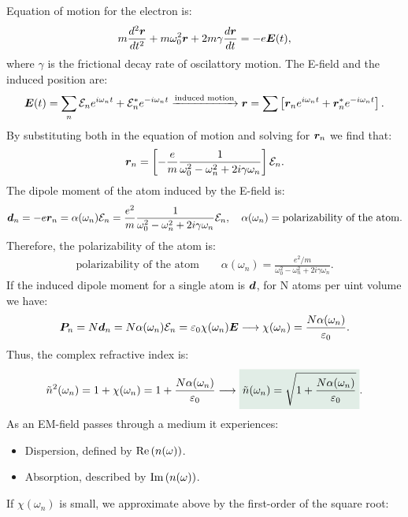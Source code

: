 Equation of motion for the electron is:
\begin{align}
    m\frac{d^2\bm{r}}{dt^2}+m\omega_0^2\bm{r}+2m\gamma\frac{d\bm{r}}{dt}=-e\bm{E}(t),
\end{align}
where $\gamma$ is the frictional decay rate of oscilattory motion. The E-field and the induced position are:
\begin{align}
    \bm{E}(t)=\sum_n\mathcal{E}_ne^{i\omega_nt}+\mathcal{E}^*_ne^{-i\omega_nt}\xrightarrow{\text{induced motion}}\bm{r}=\sum\left[\bm{r}_ne^{i\omega_nt}+\bm{r}_n^*e^{-i\omega_nt}\right].
\end{align}
By substituting both in the equation of motion and solving for $\bm{r}_n$ we find that:
\begin{align}
    \bm{r}_n=\left[-\frac{e}{m}\frac{1}{\omega_0^2-\omega_n^2+2i\gamma\omega_n}\right]\mathcal{E}_n.
\end{align}
The dipole moment of the atom induced by the E-field is:
\begin{align}
    \bm{d}_n=-e\bm{r}_n=\alpha(\omega_n)\mathcal{E}_n=\frac{e^2}{m}\frac{1}{\omega_0^2-\omega_n^2+2i\gamma\omega_n}\mathcal{E}_n,\quad\alpha(\omega_n)=\text{polarizability of the atom}.
\end{align}
Therefore, the polarizability of the atom is:
\begin{align}
    \text{polarizability of the atom}\qquad\alpha(\omega_n)=\frac{e^2/m}{\omega_0^2-\omega_n^2+2i\gamma\omega_n}.
\end{align}
If the induced dipole moment for a single atom is $\bm{d}$, for N atoms per uint volume we have:
\begin{align}
    \bm{P}_n=N\bm{d}_n=N\alpha(\omega_n)\mathcal{E}_n=\varepsilon_0\chi(\omega_n)\bm{E}\longrightarrow\chi(\omega_n)=\frac{N\alpha(\omega_n)}{\varepsilon_0}.
\end{align}
Thus, the complex refractive index is:
\begin{align}
    \tilde{n}^2(\omega_n)=1+\chi(\omega_n)=1+\frac{N\alpha(\omega_n)}{\varepsilon_0}\longrightarrow\highlight{\tilde{n}(\omega_n)=\sqrt{1+\frac{N\alpha(\omega_n)}{\varepsilon_0}}}. 
\end{align}
As an EM-field passes through a medium it experiences:
\begin{itemize}[itemsep=0pt,topsep=0pt,parsep=0pt]
    \item Dispersion, defined by $\text{Re}\left(n(\omega)\right)$.\\
    \item Absorption, described by $\text{Im}\left(n(\omega)\right)$.
\end{itemize}
If $\chi(\omega_n)$ is small, we approximate above by the first-order of the square root:
